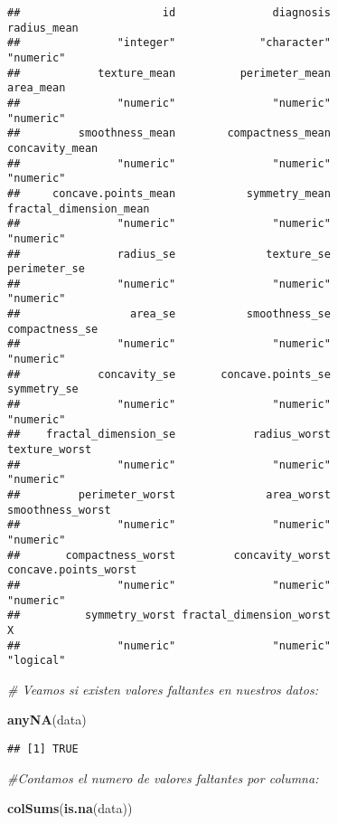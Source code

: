 \documentclass[
]{article}
\newenvironment{Shaded}{\begin{snugshade}}{\end{snugshade}}
\newcommand{\CommentTok}[1]{\textcolor[rgb]{0.56,0.35,0.01}{\textit{#1}}}
\newcommand{\FunctionTok}[1]{\textcolor[rgb]{0.13,0.29,0.53}{\textbf{#1}}}
\newcommand{\NormalTok}[1]{#1}
\begin{document}
\begin{verbatim}
##                      id               diagnosis             radius_mean 
##               "integer"             "character"               "numeric" 
##            texture_mean          perimeter_mean               area_mean 
##               "numeric"               "numeric"               "numeric" 
##         smoothness_mean        compactness_mean          concavity_mean 
##               "numeric"               "numeric"               "numeric" 
##     concave.points_mean           symmetry_mean  fractal_dimension_mean 
##               "numeric"               "numeric"               "numeric" 
##               radius_se              texture_se            perimeter_se 
##               "numeric"               "numeric"               "numeric" 
##                 area_se           smoothness_se          compactness_se 
##               "numeric"               "numeric"               "numeric" 
##            concavity_se       concave.points_se             symmetry_se 
##               "numeric"               "numeric"               "numeric" 
##    fractal_dimension_se            radius_worst           texture_worst 
##               "numeric"               "numeric"               "numeric" 
##         perimeter_worst              area_worst        smoothness_worst 
##               "numeric"               "numeric"               "numeric" 
##       compactness_worst         concavity_worst    concave.points_worst 
##               "numeric"               "numeric"               "numeric" 
##          symmetry_worst fractal_dimension_worst                       X 
##               "numeric"               "numeric"               "logical"
\end{verbatim}

\begin{Shaded}
\begin{Highlighting}[]
\CommentTok{\# Veamos si existen valores faltantes en nuestros datos:}

\FunctionTok{anyNA}\NormalTok{(data)}
\end{Highlighting}
\end{Shaded}

\begin{verbatim}
## [1] TRUE
\end{verbatim}

\begin{Shaded}
\begin{Highlighting}[]
\CommentTok{\#Contamos el numero de valores faltantes por columna:}

\FunctionTok{colSums}\NormalTok{(}\FunctionTok{is.na}\NormalTok{(data))}
\end{Highlighting}
\end{Shaded}
\end{document}
